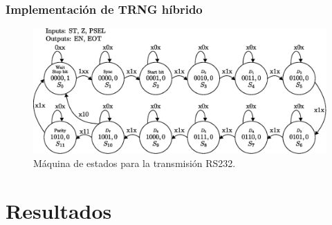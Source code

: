 \documentclass[10pt]{beamer}
\begin{document}
\begin{frame}
    \frametitle{Implementación de TRNG híbrido}
	\begin{figure}[hbtp]
            \centering
            \includegraphics[width=0.8\linewidth]{C0_fsm_rs232}
            \caption{Máquina de estados para la transmisión RS232.}
            \label{fig:C0_fsm_rs232}
        \end{figure}
\end{frame}



\section{Resultados}
\end{document}
